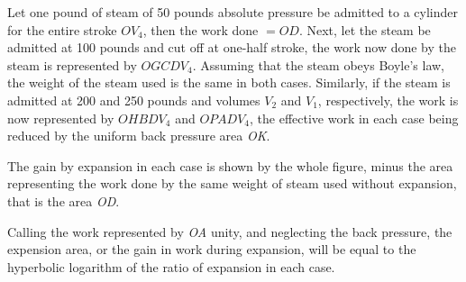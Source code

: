 \documentclass[11pt, a5paper]{book}
\begin{document}
Let one pound of steam of 50 pounds absolute pressure be admitted to a
cylinder for the entire stroke $OV_4$, then the work done $= OD$.
Next, let the steam be admitted at 100 pounds and cut off at one-half
stroke, the work now done by the steam is represented by $OGCDV_4$.
Assuming that the steam obeys Boyle's law, the weight of the steam
used is the same in both cases.  Similarly, if the steam is admitted
at 200 and 250 pounds and volumes $V_2$ and $V_1$, respectively, the
work is now represented by $OHBDV_4$ and $OPADV_4$, the effective work
in each case being reduced by the uniform back pressure area
\textit{OK}.\par

The gain by expansion in each case is shown by the whole figure, minus
the area representing the work done by the same weight of steam used
without expansion, that is the area \textit{OD}.\par

Calling the work represented by \textit{OA} unity, and neglecting the
back pressure, the expension area, or the gain in work during
expansion, will be equal to the hyperbolic logarithm of the ratio of
expansion in each case.\par
\end{document}
